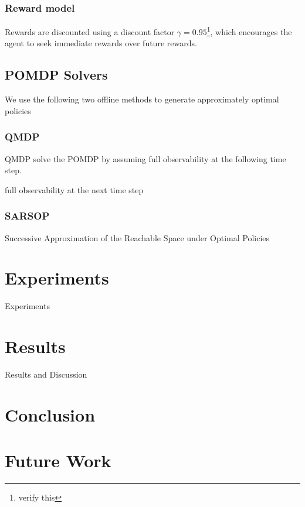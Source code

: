 \documentclass[conference]{IEEEtran}
\begin{document}
\subsubsection{Reward model} Rewards are discounted using a discount factor $\gamma = 0.95$\footnote{verify this}, which encourages the agent to seek immediate rewards over future rewards.  



\subsection{POMDP Solvers}

We use the following two offline methods to generate approximately optimal policies

\subsubsection{QMDP}
QMDP solve the POMDP by assuming full observability at the following time step. \cite{Littman1995LearningUp}

full observability at the next time step

\subsubsection{SARSOP}
Successive Approximation of the Reachable Space under Optimal Policies 
\cite{Kurniawati2009SARSOP:Spaces}


\section{Experiments}
\label{sec:experiments}

Experiments

\section{Results}
\label{sec:results}


Results and Discussion

\section{Conclusion}
\label{sec:conclusion}



\section{Future Work}
\label{sec:future-work}




\end{document}
